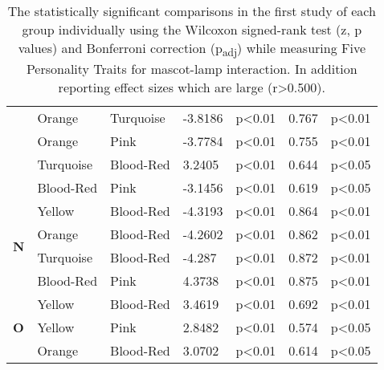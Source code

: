 \begin{table}
\begin{center}
\begin{tabular} { |p{0.5cm}| p{2cm}|p{2cm}|p{1.5cm}| p{1.7cm}|p{1cm}|p{1.5cm}|  }
            &Orange &Turquoise &-3.8186 &p<0.01 &0.767 &p<0.01\\
            &Orange &Pink &-3.7784 &p<0.01 &0.755 &p<0.01\\
            &Turquoise &Blood-Red &3.2405 &p<0.01 &0.644 &p<0.05\\
            &Blood-Red &Pink &-3.1456 &p<0.01 &0.619 &p<0.05\\
            \hline
            \hline
            \multirow{4}{*}{\textbf{N}}
            &Yellow &Blood-Red &-4.3193 &p<0.01 &0.864 &p<0.01\\
            &Orange &Blood-Red &-4.2602 &p<0.01 &0.862 &p<0.01\\
            &Turquoise &Blood-Red &-4.287 &p<0.01 &0.872 &p<0.01\\
            &Blood-Red &Pink &4.3738 &p<0.01 &0.875 &p<0.01\\
            \hline
            \hline
            \multirow{4}{*}{\textbf{O}}
            &Yellow &Blood-Red &3.4619 &p<0.01 &0.692 &p<0.01\\
            &Yellow &Pink &2.8482 &p<0.01 &0.574 &p<0.05\\
            &Orange &Blood-Red &3.0702 &p<0.01 &0.614 &p<0.05\\
            \hline
        \end{tabular}
    \end{center}
    \captionsetup{width=13.5cm}
    \caption{The statistically significant comparisons in the first study of each group individually using the Wilcoxon signed-rank
    test (z, p values) and Bonferroni correction (p\textsubscript{adj}) while measuring Five Personality Traits for mascot-lamp interaction.
    In addition reporting effect sizes which are large (r>0.500).}
    \label{table:wilcoxML1}
\end{table}

